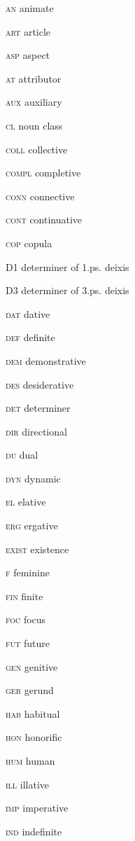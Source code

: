 \begin{refsection}
\begin{multicols}{2}
	\textsc{an}  animate
	
	\textsc{art}  article
	
	\textsc{asp}  aspect
	
	\textsc{at}  attributor
	
	\textsc{aux}  auxiliary
	
	\textsc{cl}  noun class
	
	\textsc{coll}  collective
	
	\textsc{compl}  completive
	
	\textsc{conn}  connective
	
	\textsc{cont}  continuative
	
	\textsc{cop}  copula
	
	\textsc{D1}  determiner of 1.ps. deixis
	
	\textsc{D3}  determiner of 3.ps. deixis
	
	\textsc{dat}  dative
	
	\textsc{def}  definite
	
	\textsc{dem}  demonstrative
	
	\textsc{des}  desiderative
	
	\textsc{det}  determiner
	
	\textsc{dir}  directional
	
	\textsc{du}  dual
	
	\textsc{dyn}  dynamic
	
	\textsc{el}  elative
	
	\textsc{erg}  ergative
	
	\textsc{exist}  existence
	
	\textsc{f}  feminine
	
	\textsc{fin}  finite
	
	\textsc{foc}  focus
	
	\textsc{fut}  future
	
	\textsc{gen}  genitive

	
	\textsc{ger}  gerund
	
	\textsc{hab}  habitual
	
	\textsc{hon}  honorific
	
	\textsc{hum}  human
	
	\textsc{ill}  illative
	
	\textsc{imp}  imperative
	
	\textsc{ind}  indefinite
	

\end{multicols}
\end{refsection}
